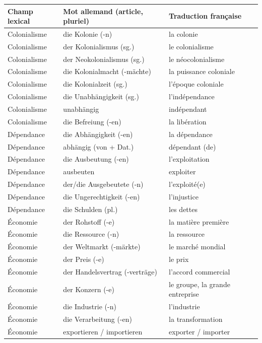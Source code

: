 \documentclass[11pt]{article}
\begin{document}
\begin{center}
\begin{tabularx}{\linewidth}{|X|X|X|}
\hline
\rowcolor{popblueL} Champ lexical & Mot allemand (article, pluriel) & Traduction française \\
\hline
Colonialisme & die Kolonie (-n) & la colonie \\
\hline
Colonialisme & der Kolonialismus (sg.) & le colonialisme \\
\hline
Colonialisme & der Neokolonialismus (sg.) & le néocolonialisme \\
\hline
Colonialisme & die Kolonialmacht (-mächte) & la puissance coloniale \\
\hline
Colonialisme & die Kolonialzeit (sg.) & l'époque coloniale \\
\hline
Colonialisme & die Unabhängigkeit (sg.) & l'indépendance \\
\hline
Colonialisme & unabhängig & indépendant \\
\hline
Colonialisme & die Befreiung (-en) & la libération \\
\hline
Dépendance & die Abhängigkeit (-en) & la dépendance \\
\hline
Dépendance & abhängig (von + Dat.) & dépendant (de) \\
\hline
Dépendance & die Ausbeutung (-en) & l'exploitation \\
\hline
Dépendance & ausbeuten & exploiter \\
\hline
Dépendance & der/die Ausgebeutete (-n) & l'exploité(e) \\
\hline
Dépendance & die Ungerechtigkeit (-en) & l'injustice \\
\hline
Dépendance & die Schulden (pl.) & les dettes \\
\hline
Économie & der Rohstoff (-e) & la matière première \\
\hline
Économie & die Ressource (-n) & la ressource \\
\hline
Économie & der Weltmarkt (-märkte) & le marché mondial \\
\hline
Économie & der Preis (-e) & le prix \\
\hline
Économie & der Handelsvertrag (-verträge) & l'accord commercial \\
\hline
Économie & der Konzern (-e) & le groupe, la grande entreprise \\
\hline
Économie & die Industrie (-n) & l'industrie \\
\hline
Économie & die Verarbeitung (-en) & la transformation \\
\hline
Économie & exportieren / importieren & exporter / importer \\
\hline
\end{tabularx}
\end{center}
\end{document}
